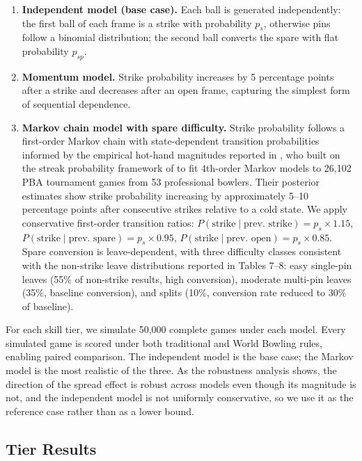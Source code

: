 \documentclass[USenglish]{article}
\theoremstyle{dgthm}
\theoremstyle{dgdef}
\begin{document}
\begin{enumerate}
  \item \textbf{Independent model (base case).} Each ball is generated independently: the first ball of each frame is a strike with probability $p_s$, otherwise pins follow a binomial distribution; the second ball converts the spare with flat probability $p_{sp}$.
  \item \textbf{Momentum model.} Strike probability increases by 5 percentage points after a strike and decreases after an open frame, capturing the simplest form of sequential dependence.
  \item \textbf{Markov chain model with spare difficulty.} Strike probability follows a first-order Markov chain with state-dependent transition probabilities informed by the empirical hot-hand magnitudes reported in \citet{vanderwerken2018}, who built on the streak probability framework of \citet{martin2006} to fit 4th-order Markov models to 26,102 PBA tournament games from 53 professional bowlers. Their posterior estimates show strike probability increasing by approximately 5--10 percentage points after consecutive strikes relative to a cold state. We apply conservative first-order transition ratios: $P(\text{strike} \mid \text{prev.\ strike}) = p_s \times 1.15$, $P(\text{strike} \mid \text{prev.\ spare}) = p_s \times 0.95$, $P(\text{strike} \mid \text{prev.\ open}) = p_s \times 0.85$. Spare conversion is leave-dependent, with three difficulty classes consistent with the non-strike leave distributions reported in \citet{vanderwerken2018} Tables 7--8: easy single-pin leaves (55\% of non-strike results, high conversion), moderate multi-pin leaves (35\%, baseline conversion), and splits (10\%, conversion rate reduced to 30\% of baseline).
\end{enumerate}

For each skill tier, we simulate 50,000 complete games under each model. Every simulated game is scored under both traditional and World Bowling rules, enabling paired comparison. The independent model is the base case; the Markov model is the most realistic of the three. As the robustness analysis shows, the direction of the spread effect is robust across models even though its magnitude is not, and the independent model is not uniformly conservative, so we use it as the reference case rather than as a lower bound.

\subsection{Tier Results}
\end{document}
